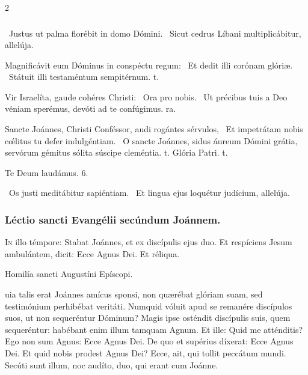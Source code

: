 \documentclass[9pt,twoside]{extarticle}
\begin{document}
\begin{multicols}{2}
\subsubsection*{}
\begin{tightlist}{}
\item {}~Justus ut palma florébit in domo Dómini. ~Sicut cedrus Líbani multiplicábitur, allelúja.
\item {} Magnificávit eum Dóminus in conspéctu regum: \textred{*}~Et dedit illi corónam glóriæ. ~Státuit illi testaméntum sempitérnum. t.
\item {} Vir Israelíta, gaude cohéres Christi: \textred{*}~Ora pro nobis. ~Ut précibus tuis a Deo véniam sperémus, devóti ad te confúgimus. ra.
\item {} Sancte Joánnes, Christi Conféssor, audi rogántes sérvulos, \textred{*}~Et impetrátam nobis cœ́litus tu defer indulgéntiam. ~O sancte Joánnes, sidus áureum Dómini grátia, servórum gémitus sólita súscipe cleméntia. t. Glória Patri. t. 
\item Te Deum laudámus. 6.
\item {}~Os justi meditábitur sapiéntiam. ~Et lingua ejus loquétur judícium, allelúja.
\end{tightlist}

\subsubsection*{\center {}}
\subsubsection*{\center Léctio sancti Evangélii secúndum Joánnem.}
\lettrine{I}n illo témpore: Stabat Joánnes, et ex discípulis ejus duo. Et respíciens Jesum ambulántem, dicit: Ecce Agnus Dei. Et réliqua.

\begin{center}Homilía sancti Augustíni Epíscopi.\\
\end{center}
uia talis erat Joánnes amícus sponsi, non quærébat glóriam suam, sed testimónium perhibébat veritáti. Numquid vóluit apud se remanére discípulos suos, ut non sequeréntur Dóminum? Magis ipse osténdit discípulis suis, quem sequeréntur: habébant enim illum tamquam Agnum. Et ille: Quid me atténditis? Ego non sum Agnus: Ecce Agnus Dei. De quo et supérius díxerat: Ecce Agnus Dei. Et quid nobis prodest Agnus Dei? Ecce, ait, qui tollit peccátum mundi. Secúti sunt illum, noc audíto, duo, qui erant cum Joánne.


\end{multicols}
\end{document}
